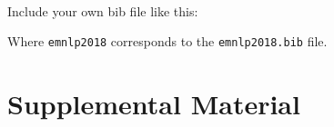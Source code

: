 \documentclass[11pt,a4paper]{article}
\begin{document}
 \\

Include your own bib file like this:
{\small\verb||
\verb||}

Where \verb|emnlp2018| corresponds to the {\tt emnlp2018.bib} file.



\appendix

\section{Supplemental Material}
\end{document}
